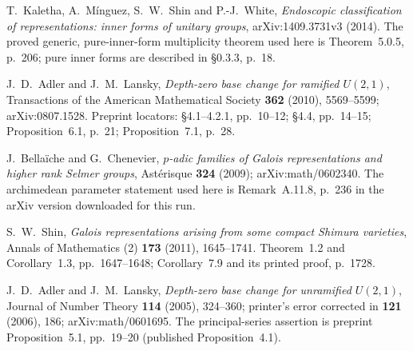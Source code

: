T.~Kaletha, A.~M\'inguez, S.~W.~Shin and P.-J.~White,
\emph{Endoscopic classification of representations: inner forms of unitary groups},
arXiv:1409.3731v3 (2014).
The proved generic, pure-inner-form multiplicity theorem used here is
Theorem~5.0.5, p.~206; pure inner forms are described in \S0.3.3, p.~18.

J.~D.~Adler and J.~M.~Lansky,
\emph{Depth-zero base change for ramified $U(2,1)$},
Transactions of the American Mathematical Society \textbf{362} (2010),
5569--5599; arXiv:0807.1528.
Preprint locators: \S4.1--4.2.1, pp.~10--12;
\S4.4, pp.~14--15; Proposition~6.1, p.~21;
Proposition~7.1, p.~28.

J.~Bella\"iche and G.~Chenevier,
\emph{$p$-adic families of Galois representations and higher rank Selmer groups},
Ast\'erisque \textbf{324} (2009); arXiv:math/0602340.
The archimedean parameter statement used here is Remark~A.11.8,
p.~236 in the arXiv version downloaded for this run.

S.~W.~Shin,
\emph{Galois representations arising from some compact Shimura varieties},
Annals of Mathematics (2) \textbf{173} (2011), 1645--1741.
Theorem~1.2 and Corollary~1.3, pp.~1647--1648;
Corollary~7.9 and its printed proof, p.~1728.

J.~D.~Adler and J.~M.~Lansky,
\emph{Depth-zero base change for unramified $U(2,1)$},
Journal of Number Theory \textbf{114} (2005), 324--360;
printer's error corrected in \textbf{121} (2006), 186;
arXiv:math/0601695.
The principal-series assertion is preprint Proposition~5.1, pp.~19--20
(published Proposition~4.1).
